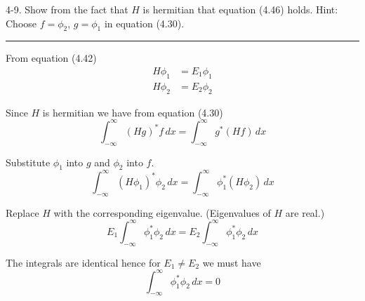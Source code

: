 \documentclass[12pt]{article}
\begin{document}
4-9.
Show from the fact that $H$ is hermitian that equation (4.46) holds.
Hint: Choose $f=\phi_2$, $g=\phi_1$ in equation (4.30).

\bigskip
\hrule

\bigskip
From equation (4.42)
\begin{align*}
H\phi_1&=E_1\phi_1
\\
H\phi_2&=E_2\phi_2
\end{align*}

Since $H$ is hermitian we have from equation (4.30)
\begin{equation*}
\int_{-\infty}^\infty(Hg)^*f\,dx=\int_{-\infty}^\infty g^*(Hf)\,dx
\tag{4.30}
\end{equation*}

Substitute $\phi_1$ into $g$ and $\phi_2$ into $f$.
\begin{equation*}
\int_{-\infty}^\infty(H\phi_1)^*\phi_2\,dx=\int_{-\infty}^\infty \phi_1^*(H\phi_2)\,dx
\end{equation*}

Replace $H$ with the corresponding eigenvalue.
(Eigenvalues of $H$ are real.)
\begin{equation*}
E_1\int_{-\infty}^\infty\phi_1^*\phi_2\,dx=E_2\int_{-\infty}^\infty \phi_1^*\phi_2\,dx
\end{equation*}

The integrals are identical hence for $E_1\ne E_2$ we must have
\begin{equation*}
\int_{-\infty}^\infty\phi_1^*\phi_2\,dx=0
\end{equation*}
\end{document}

